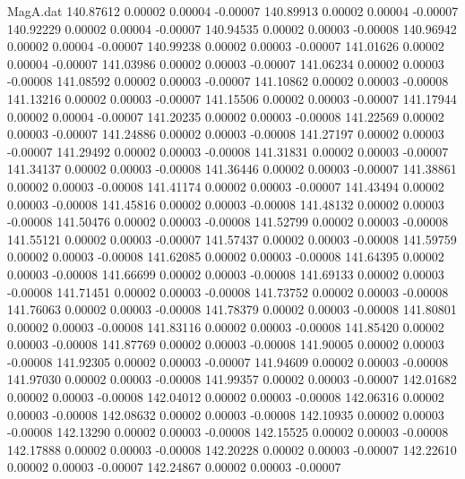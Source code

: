 \begin{filecontents}{MagA.dat}
 140.87612    0.00002    0.00004   -0.00007
 140.89913    0.00002    0.00004   -0.00007
 140.92229    0.00002    0.00004   -0.00007
 140.94535    0.00002    0.00003   -0.00008
 140.96942    0.00002    0.00004   -0.00007
 140.99238    0.00002    0.00003   -0.00007
 141.01626    0.00002    0.00004   -0.00007
 141.03986    0.00002    0.00003   -0.00007
 141.06234    0.00002    0.00003   -0.00008
 141.08592    0.00002    0.00003   -0.00007
 141.10862    0.00002    0.00003   -0.00008
 141.13216    0.00002    0.00003   -0.00007
 141.15506    0.00002    0.00003   -0.00007
 141.17944    0.00002    0.00004   -0.00007
 141.20235    0.00002    0.00003   -0.00008
 141.22569    0.00002    0.00003   -0.00007
 141.24886    0.00002    0.00003   -0.00008
 141.27197    0.00002    0.00003   -0.00007
 141.29492    0.00002    0.00003   -0.00008
 141.31831    0.00002    0.00003   -0.00007
 141.34137    0.00002    0.00003   -0.00008
 141.36446    0.00002    0.00003   -0.00007
 141.38861    0.00002    0.00003   -0.00008
 141.41174    0.00002    0.00003   -0.00007
 141.43494    0.00002    0.00003   -0.00008
 141.45816    0.00002    0.00003   -0.00008
 141.48132    0.00002    0.00003   -0.00008
 141.50476    0.00002    0.00003   -0.00008
 141.52799    0.00002    0.00003   -0.00008
 141.55121    0.00002    0.00003   -0.00007
 141.57437    0.00002    0.00003   -0.00008
 141.59759    0.00002    0.00003   -0.00008
 141.62085    0.00002    0.00003   -0.00008
 141.64395    0.00002    0.00003   -0.00008
 141.66699    0.00002    0.00003   -0.00008
 141.69133    0.00002    0.00003   -0.00008
 141.71451    0.00002    0.00003   -0.00008
 141.73752    0.00002    0.00003   -0.00008
 141.76063    0.00002    0.00003   -0.00008
 141.78379    0.00002    0.00003   -0.00008
 141.80801    0.00002    0.00003   -0.00008
 141.83116    0.00002    0.00003   -0.00008
 141.85420    0.00002    0.00003   -0.00008
 141.87769    0.00002    0.00003   -0.00008
 141.90005    0.00002    0.00003   -0.00008
 141.92305    0.00002    0.00003   -0.00007
 141.94609    0.00002    0.00003   -0.00008
 141.97030    0.00002    0.00003   -0.00008
 141.99357    0.00002    0.00003   -0.00007
 142.01682    0.00002    0.00003   -0.00008
 142.04012    0.00002    0.00003   -0.00008
 142.06316    0.00002    0.00003   -0.00008
 142.08632    0.00002    0.00003   -0.00008
 142.10935    0.00002    0.00003   -0.00008
 142.13290    0.00002    0.00003   -0.00008
 142.15525    0.00002    0.00003   -0.00008
 142.17888    0.00002    0.00003   -0.00008
 142.20228    0.00002    0.00003   -0.00007
 142.22610    0.00002    0.00003   -0.00007
 142.24867    0.00002    0.00003   -0.00007

\end{filecontents}
